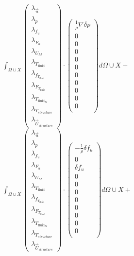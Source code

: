 \documentclass[10pt]{article} %
\begin{document}
\begin{center}
	$\int_{\Omega \cup X}
	\begin{pmatrix}
		\lambda_{\vec{u}} \\ \lambda_p \\ \lambda_{f_u} \\ \lambda_{F_u} \\ \lambda_{U_M}\\ \lambda_{T_{\text{fluid}}} \\ \lambda_{f_{T_{\text{fluid}}}} \\ \lambda_{F_{T_{\text{fluid}}}} \\ \lambda_{T_{\text{fluid}_M}} \\ \lambda_{T_{structure}} \\ \lambda_{\vec{U}_{structure}}
	\end{pmatrix}
	\cdot
	\begin{pmatrix}
		\frac{1}{\rho} \nabla \delta p \\
		0\\
		0 \\
		0 \\
		0 \\
		0 \\
		0\\
		0\\
		0\\
		0\\
		0\\
	\end{pmatrix}
	d\Omega \cup X + $\\

	$\int_{\Omega \cup X}
	\begin{pmatrix}
		\lambda_{\vec{u}} \\ \lambda_p \\ \lambda_{f_u} \\ \lambda_{F_u} \\ \lambda_{U_M}\\ \lambda_{T_{\text{fluid}}} \\ \lambda_{f_{T_{\text{fluid}}}} \\ \lambda_{F_{T_{\text{fluid}}}} \\ \lambda_{T_{\text{fluid}_M}} \\ \lambda_{T_{structure}} \\ \lambda_{\vec{U}_{structure}}
	\end{pmatrix}
	\cdot
	\begin{pmatrix}
		-\frac{1}{\rho}\delta f_u \\
		0\\
		\delta f_u \\
		0 \\
		0 \\
		0 \\
		0\\
		0\\
		0\\
		0\\
		0\\
	\end{pmatrix}
	d\Omega \cup X + $\\


\end{center}
\end{document}
